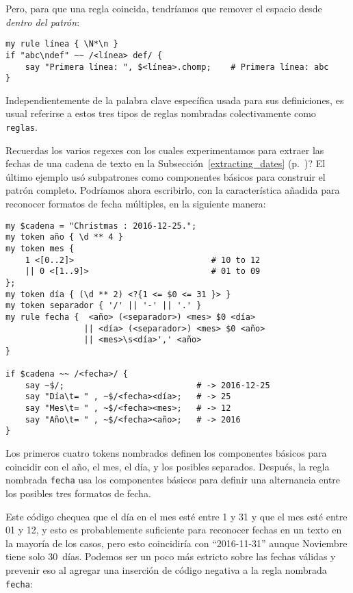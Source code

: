 Pero, para que una regla coincida, tendríamos que remover 
el espacio desde \emph{dentro del patrón}:

\begin{verbatim}
my rule línea { \N*\n }
if "abc\ndef" ~~ /<línea> def/ {
    say "Primera línea: ", $<línea>.chomp;    # Primera línea: abc
}
\end{verbatim} 

Independientemente de la palabra clave específica usada
para sus definiciones, es usual referirse a estos tres tipos
de reglas nombradas colectivamente como {\tt reglas}.

Recuerdas los varios regexes con los cuales
experimentamos para extraer las fechas de una cadena de
texto en la Subsección~\ref{extracting_dates} 
(p.~\pageref{extracting_dates})? El último ejemplo
usó subpatrones como componentes básicos para 
construir el patrón completo. Podríamos ahora escribirlo,
con la característica añadida para reconocer formatos de
fecha múltiples, en la siguiente manera:

\begin{verbatim}
my $cadena = "Christmas : 2016-12-25.";                                         
my token año { \d ** 4 }                                        
my token mes {   
    1 <[0..2]>                            # 10 to 12                     
    || 0 <[1..9]>                         # 01 to 09                     
};
my token día { (\d ** 2) <?{1 <= $0 <= 31 }> }  
my token separador { '/' || '-' || '.' } 
my rule fecha {  <año> (<separador>) <mes> $0 <día> 
                || <día> (<separador>) <mes> $0 <año> 
                || <mes>\s<día>',' <año>
}                         

if $cadena ~~ /<fecha>/ {
    say ~$/;                           # -> 2016-12-25
    say "Día\t= " , ~$/<fecha><día>;   # -> 25
    say "Mes\t= " , ~$/<fecha><mes>;   # -> 12
    say "Año\t= " , ~$/<fecha><año>;   # -> 2016
}          
\end{verbatim} 

Los primeros cuatro tokens nombrados definen los componentes
básicos para coincidir con el año, el mes, el día, y los posibles
separados. Después, la regla nombrada {\tt fecha} usa los 
componentes básicos para definir una alternancia entre los 
posibles tres formatos de fecha.

Este código chequea que el día en el mes esté entre 1 y 31
y que el mes esté entre 01 y 12, y esto es probablemente
suficiente para reconocer fechas en un texto en la 
mayoría de los casos, pero esto coincidiría con ``2016-11-31''
aunque Noviembre tiene solo 30~días. Podemos ser un poco
más estricto sobre las fechas válidas y prevenir eso al
agregar una inserción de código negativa a la regla nombrada
{\tt fecha}:

